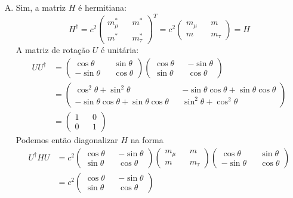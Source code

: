 \documentclass[a4paper, 12pt, notitlepage]{article}
\begin{document}
\begin{enumerate}
\begin{enumerate}[(A)]
  \item Sim, a matriz $H$ é hermitiana:
  \[ H^\dagger = c^2 \begin{pmatrix}
  m_\mu^\ast && m^\ast \\
  m^\ast && m_\tau^\ast \end{pmatrix}^T = c^2 \begin{pmatrix}
  m_\mu && m \\
  m && m_\tau\end{pmatrix} = H \]
  A matriz de rotação $U$ é unitária:
  \begin{align*}
  U U^\dagger &= \begin{pmatrix} \cos \theta && \sin \theta \\
  -\sin \theta && \cos \theta \end{pmatrix} \begin{pmatrix} 
  \cos \theta && -\sin \theta \\
  \sin \theta && \cos\theta \end{pmatrix} \\
  &= \begin{pmatrix}
  \cos^2 \theta + \sin^2 \theta && -\sin\theta \cos\theta + \sin\theta \cos \theta \\
  -\sin \theta \cos \theta + \sin \theta \cos \theta && \sin^2\theta + \cos^2 \theta
  \end{pmatrix} \\
  &= \begin{pmatrix}
  1 && 0 \\
  0 && 1
  \end{pmatrix}
  \end{align*} 
  Podemos então diagonalizar $H$ na forma
  \begin{align*}
  U^\dagger H U &= c^2\begin{pmatrix} 
  \cos \theta && -\sin \theta \\
  \sin \theta && \cos\theta 
  \end{pmatrix}\begin{pmatrix}
  m_\mu && m \\
  m && m_\tau
  \end{pmatrix} \begin{pmatrix}
  \cos \theta && \sin \theta \\
  -\sin \theta && \cos \theta
  \end{pmatrix} \\
  &= c^2\begin{pmatrix} 
  \cos \theta && -\sin \theta \\
  \sin \theta && \cos\theta 

\end{pmatrix}
\end{align*}
\end{enumerate}
\end{enumerate}
\end{document}
